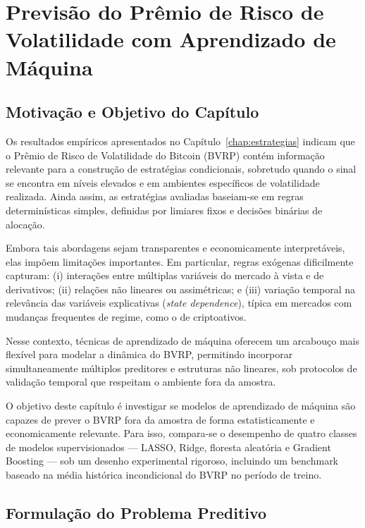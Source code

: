 \chapter{Previsão do Prêmio de Risco de Volatilidade com Aprendizado de Máquina}
\label{chap:ml_bvrp}

\section{Motivação e Objetivo do Capítulo}
\label{sec:cap8_motivacao}

Os resultados empíricos apresentados no Capítulo~\ref{chap:estrategias}
indicam que o Prêmio de Risco de Volatilidade do Bitcoin (BVRP) contém informação
relevante para a construção de estratégias condicionais, sobretudo quando o sinal
se encontra em níveis elevados e em ambientes específicos de volatilidade realizada.
Ainda assim, as estratégias avaliadas baseiam-se em regras determinísticas simples,
definidas por limiares fixos e decisões binárias de alocação.

Embora tais abordagens sejam transparentes e economicamente interpretáveis, elas
impõem limitações importantes. Em particular, regras exógenas dificilmente capturam:
(i) interações entre múltiplas variáveis do mercado à vista e de derivativos;
(ii) relações não lineares ou assimétricas; e (iii) variação temporal na relevância
das variáveis explicativas (\textit{state dependence}), típica em mercados com mudanças
frequentes de regime, como o de criptoativos.

Nesse contexto, técnicas de aprendizado de máquina oferecem um arcabouço mais
flexível para modelar a dinâmica do BVRP, permitindo incorporar simultaneamente
múltiplos preditores e estruturas não lineares, sob protocolos de validação temporal
que respeitam o ambiente fora da amostra.

O objetivo deste capítulo é investigar se modelos de aprendizado de máquina
são capazes de prever o BVRP fora da amostra de forma estatisticamente e
economicamente relevante. Para isso, compara-se o desempenho de quatro classes
de modelos supervisionados --- LASSO, Ridge, floresta aleatória e Gradient Boosting ---
sob um desenho experimental rigoroso, incluindo um benchmark baseado na média
histórica incondicional do BVRP no período de treino.

\section{Formulação do Problema Preditivo}
\label{sec:cap8_problema}

